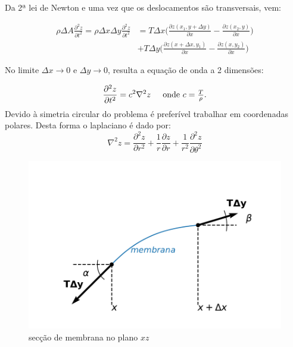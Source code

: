 \documentclass[10pt]{SelfArx} %
\begin{document}
Da 2ª lei de Newton e uma vez que os deslocamentos são transversais, vem:

\begin{align*}
    \rho \Delta A \frac{\partial^2{z}}{\partial{t^2}} = \rho \Delta x \Delta y \frac{\partial^2{z}}{\partial{t^2}} &= T\Delta x\bigg( \frac{\partial z(x_1, y + \Delta y)}{\partial x} - \frac{\partial z(x_2, y)}{\partial x}\bigg) \\
     &+ T\Delta y\bigg( \frac{\partial z(x + \Delta x, y_1)}{\partial x} - \frac{\partial z(x, y_2)}{\partial x}\bigg)
\end{align*}

No limite $\Delta x \longrightarrow 0$ e $\Delta y\longrightarrow 0$, resulta a equação de onda a 2 dimensões:

\begin{equation}
    \frac{\partial^2{z}}{\partial{t^2}} = c^2 \nabla^2z \hspace{0.5 cm}  \mbox{onde $c = \frac{T}{\rho}$.}
    \label{func_onda}
\end{equation}
Devido à simetria circular do problema é preferível trabalhar em coordenadas polares. Desta forma o laplaciano é dado por:
\begin{equation*}
    \nabla^2z=\frac{\partial^2{z}}{\partial{r^2}} +\frac{1}{r}\frac{\partial{z}}{\partial{r}} + \frac{1}{r^2}\frac{\partial^2{z}}{\partial{\theta^2}} 
\end{equation*}

\vspace{-0.55cm}

\begin{figure}[ht]
\centering
\captionsetup{justification=centering}
\includegraphics[width=0.8\linewidth]{TCFE_4/horizontal.pdf}
\caption{secção de membrana no plano $xz$}
\label{esquema}
\end{figure}
\end{document}
